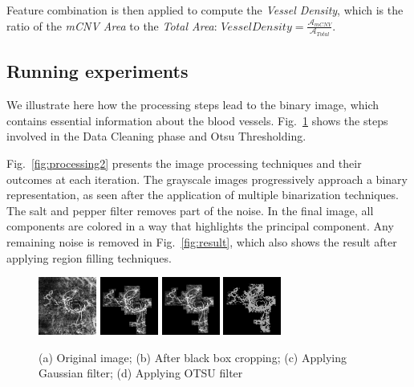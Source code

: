 \documentclass[conference]{IEEEtran}
\begin{document}
Feature combination is then applied to compute the \textit{Vessel Density}, which is the ratio of the \textit{mCNV Area} to the \textit{Total Area}:
$VesselDensity= \frac{\mathcal{A}_{mCNV} }{\mathcal{A}_{Total}}$.


\subsection{Running experiments}
We illustrate here how the processing steps lead to the binary image, which contains essential information about the blood vessels.
Fig.~\ref{fig:processing} shows the steps involved in the Data Cleaning phase and Otsu Thresholding. 

Fig.~\ref{fig:processing2} presents the image processing techniques and their outcomes at each iteration. 
The grayscale images progressively approach a binary representation, as seen after the application of multiple binarization techniques. 
The salt and pepper filter removes part of the noise. 
In the final image, all components are colored in a way that highlights the principal component. 
Any remaining noise is removed in Fig.~\ref{fig:result}, which also shows the result after applying region filling techniques.


\begin{figure}%
    \centering
    \includegraphics[width=0.17\textwidth]{fig/1original.png} \hfill
    \includegraphics[width=0.17\textwidth]{fig/2blackbox.png}\hfill
    \includegraphics[width=0.17\textwidth]{fig/3gaussfilter.png} \hfill
    \includegraphics[width=0.17\textwidth]{fig/3.1otsu.jpeg}
    \caption{(a) Original image; (b) After black box cropping; (c) Applying Gaussian filter; (d) Applying OTSU filter}
    \label{fig:processing}
\end{figure}
\end{document}
